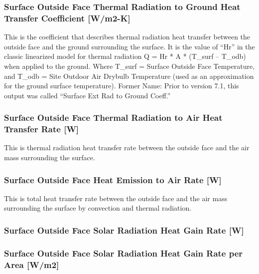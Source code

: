 \subsubsection{Surface Outside Face Thermal Radiation to Ground Heat Transfer Coefficient {[}W/m2-K{]}}\label{surface-outside-face-thermal-radiation-to-ground-heat-transfer-coefficient-wm2-k}

This is the coefficient that describes thermal radiation heat transfer between the outside face and the ground surrounding the surface. It is the value of ``Hr'' in the classic linearized model for thermal radiation Q = Hr * A * (T\_surf -- T\_odb) when applied to the ground. Where T\_surf = Surface Outside Face Temperature, and T\_odb = Site Outdoor Air Drybulb Temperature (used as an approximation for the ground surface temperature). Former Name: Prior to version 7.1, this output was called ``Surface Ext Rad to Ground Coeff.''

\subsubsection{Surface Outside Face Thermal Radiation to Air Heat Transfer Rate {[}W{]}}\label{surface-outside-face-thermal-radiation-to-air-heat-transfer-rate-w}

This is thermal radiation heat transfer rate between the outside face and the air mass surrounding the surface.

\subsubsection{Surface Outside Face Heat Emission to Air Rate {[}W{]}}\label{surface-outside-face-heat-emission-to-air-heat-transfer-rate-w}

This is total heat transfer rate between the outside face and the air mass surrounding the surface by convection and thermal radiation.

\subsubsection{Surface Outside Face Solar Radiation Heat Gain Rate {[}W{]}}\label{surface-outside-face-solar-radiation-heat-gain-rate-w}

\subsubsection{Surface Outside Face Solar Radiation Heat Gain Rate per Area {[}W/m2{]}}\label{surface-outside-face-solar-radiation-heat-gain-rate-per-area-wm2}


